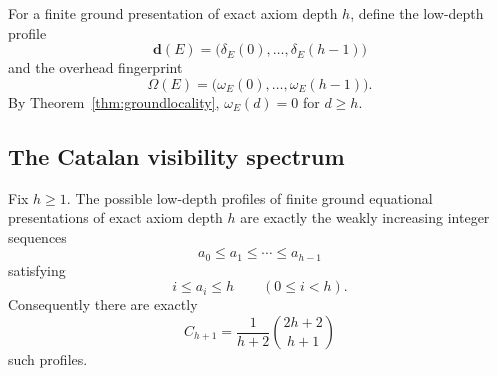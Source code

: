 For a finite ground presentation of exact axiom depth $h$, define the low-depth profile
\[
\mathbf d(E)=\bigl(\delta_E(0),\ldots,\delta_E(h-1)\bigr)
\]
and the overhead fingerprint
\[
\Omega(E)=\bigl(\omega_E(0),\ldots,\omega_E(h-1)\bigr).
\]
By Theorem~\ref{thm:groundlocality}, $\omega_E(d)=0$ for $d\ge h$.

\subsection{The Catalan visibility spectrum}

\begin{theorem}\label{thm:catalan}
Fix $h\ge1$.  The possible low-depth profiles of finite ground equational presentations of exact axiom depth $h$ are exactly the weakly increasing integer sequences
\[
a_0\le a_1\le\cdots\le a_{h-1}
\]
satisfying
\[
i\le a_i\le h
\qquad(0\le i<h).
\]
Consequently there are exactly
\[
\boxed{C_{h+1}=\frac1{h+2}\binom{2h+2}{h+1}}
\]
such profiles.
\end{theorem}

